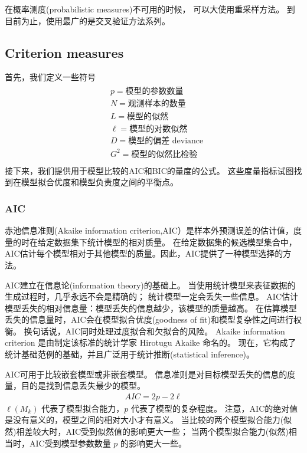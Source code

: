 \documentclass[letterpaper,10pt,english]{sphinxmanual}
\begin{document}
在概率测度(probabilistic measures)不可用的时候，
可以大使用重采样方法。
到目前为止，使用最广的是交叉验证方法系列。


\subsection{Criterion measures}
\label{\detokenize{_u6a21_u578b_u8bc4_u4f30/content:criterion-measures}}
首先，我们定义一些符号
\begin{align}\label{equation:模型评估/content:模型评估/content:34}\!\begin{aligned}
&p = \text{模型的参数数量}\\
&N = \text{观测样本的数量}\\
&L= \text{模型的似然}\\
&\ell= \text{模型的对数似然}\\
&D= \text{模型的偏差 deviance}\\
&G^2 = \text{模型的似然比检验}\\
\end{aligned}\end{align}
接下来，我们提供用于模型比较的AIC和BIC的量度的公式。
这些度量指标试图找到在模型拟合优度和模型负责度之间的平衡点。


\subsubsection{AIC}
\label{\detokenize{_u6a21_u578b_u8bc4_u4f30/content:aic}}
赤池信息准则(Akaike information criterion,AIC）是样本外预测误差的估计值，度量的时在给定数据集下统计模型的相对质量。
在给定数据集的候选模型集合中，
AIC估计每个模型相对于其他模型的质量。因此，AIC提供了一种模型选择的方法。

AIC建立在信息论(information theory)的基础上。
当使用统计模型来表征数据的生成过程时，几乎永远不会是精确的；
统计模型一定会丢失一些信息。
AIC估计模型丢失的相对信息量：模型丢失的信息越少，该模型的质量越高。
在估算模型丢失的信息量时，AIC会在模型拟合优度(goodness of fit)和模型复杂性之间进行权衡。
换句话说，AIC同时处理过度拟合和欠拟合的风险。
Akaike information criterion 是由制定该标准的统计学家 Hirotugu Akaike 命名的。
现在，它构成了统计基础范例的基础，并且广泛用于统计推断(statistical inference)。

AIC可用于比较嵌套模型或非嵌套模型。
信息准则是对目标模型丢失的信息的度量，目的是找到信息丢失最少的模型。
\begin{equation}\label{equation:模型评估/content:模型评估/content:35}
\begin{split}AIC= 2p-2 \ell\end{split}
\end{equation}
\(\ell(M_k)\) 代表了模型拟合能力，\(p\) 代表了模型的复杂程度。
注意，AIC的绝对值是没有意义的，模型之间的相对大小才有意义。
当比较的两个模型拟合能力(似然)相差较大时，AIC受到似然值的影响更大一些；
当两个模型拟合能力(似然)相当时，AIC受到模型参数数量 \(p\) 的影响更大一些。
\end{document}
